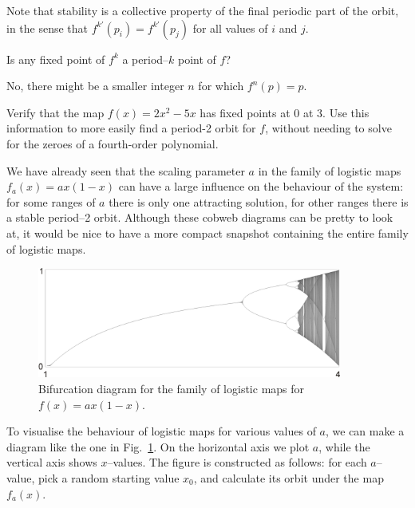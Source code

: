 Note that stability is a collective property of the final periodic part of the orbit, in the sense that $f^{k'}(p_i) = f^{k'}(p_j)$ for all values of $i$ and $j$.

\begin{exer}
Is any fixed point of $f^k$ a period--$k$ point of $f$?
\begin{sol}
No, there might be a smaller integer $n$ for which $f^n(p)=p$.  
\end{sol}
\end{exer}

\begin{exer}
Verify that the map $f(x)=2x^2-5x$ has fixed points at 0 at 3. Use this information to more easily find a period-2 orbit for $f$, without needing to solve for the zeroes of a fourth-order polynomial.
\end{exer}


\pagebreak


We have already seen that the scaling parameter $a$ in the family of logistic maps $f_a(x)=ax(1-x)$ can have a large influence on the behaviour of the system: for some ranges of $a$ there is only one attracting solution, for other ranges there is a stable period--2 orbit. Although these cobweb diagrams can be pretty to look at, it would be nice to have a more compact snapshot containing the entire family of logistic maps.

\begin{figure}[H]
\centering
\includegraphics[width=10cm]{dynamic/figures/bifurcation}
\caption{Bifurcation diagram for the family of logistic maps for $f(x)=ax(1-x)$.}
\label{fig-bifur}
\end{figure} 

To visualise the behaviour of logistic maps for various values of $a$, we can make a diagram like the one in Fig.~\ref{fig-bifur}. On the horizontal axis we plot $a$, while the vertical axis shows $x$--values. The figure is constructed as follows: for each $a$--value, pick a random starting value $x_0$, and calculate its orbit under the map $f_a(x)$.

